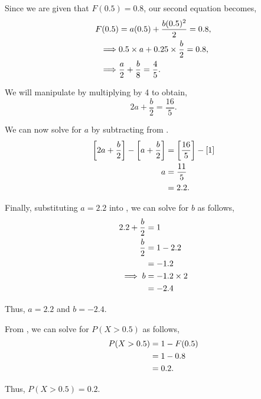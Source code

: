 \begin{subquestions}
\begin{subsubquestions}
Since we are given that $F(0.5)=0.8$, our second equation becomes,
\begin{align}
	F(0.5) & = a(0.5) + \frac{b(0.5)^2}{2} = 0.8, \nonumber \\
  \implies &  0.5 \times a + 0.25 \times \frac{b}{2} = 0.8, \nonumber \\
  \implies & \frac{a}{2} + \frac{b}{8} = \frac{4}{5}. \label{2015:q4:eqn:crv2}
\end{align}

We will manipulate  by multiplying by 4 to obtain,
\begin{equation}
	2a + \frac{b}{2} = \frac{16}{5}. \label{2015:q4:eqn:crv3}
\end{equation}

We can now solve for $a$ by subtracting  from .
\begin{align}
	\left[2a + \frac{b}{2} \right] - \left[a + \frac{b}{2} \right] & = \left[\frac{16}{5} \right] - [1] \nonumber \\
	a & = \frac{11}{5} \nonumber \\
	  & = 2.2.
\end{align}

Finally, substituting $a=2.2$ into , we can solve for $b$ as follows,
\begin{align}
	2.2 + \frac{b}{2} & = 1 \nonumber \\
	\frac{b}{2} & = 1 - 2.2 \nonumber \\
	            & = -1.2 \nonumber \\
	\implies  b & = -1.2 \times 2 \nonumber \\
	            & = -2.4
\end{align}

Thus, $a=2.2$ and $b=-2.4$.


\subsubquestion

From , we can solve for $P(X>0.5)$ as follows,
\begin{align}
	P(X>0.5) & = 1 - F(0.5) \nonumber \\
	         & = 1 - 0.8 \nonumber \\
	         & = 0.2.
\end{align}

Thus, $P(X>0.5)=0.2$.
\end{subsubquestions}



\end{subquestions}
